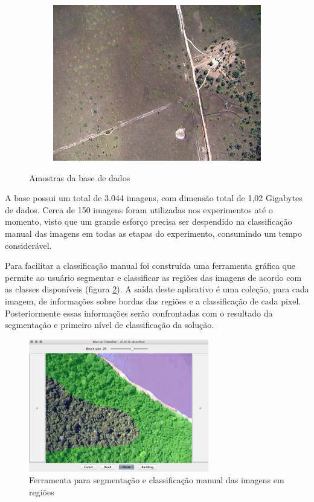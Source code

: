 \begin{figure}[h]
\begin{subfigure}[b]{0.3\textwidth}
    \includegraphics[width=\textwidth]{imgs/amostra3}
  \end{subfigure}%
  \caption{Amostras da base de dados}
  \label{fig:amostra}
\end{figure}

A base possui um total de 3.044 imagens, com dimensão total de 1,02 Gigabytes de dados. Cerca de 150 imagens foram utilizadas nos experimentos até o momento, visto que um grande esforço precisa ser despendido na classificação manual das imagens em todas as etapas do experimento, consumindo um tempo considerável.

Para facilitar a classificação manual foi construída uma ferramenta gráfica que permite ao usuário segmentar e classificar as regiões das imagens de acordo com as classes disponíveis (figura \ref{fig:visualClassifier}). A saída deste aplicativo é uma coleção, para cada imagem, de informações sobre bordas das regiões e a classificação de cada pixel. Posteriormente essas informações serão confrontadas com o resultado da segmentação e primeiro nível de classificação da solução.

\begin{figure}[h]
  \centering
  \includegraphics[width=0.7\textwidth]{imgs/visualClassifier}
  \caption{Ferramenta para segmentação e classificação manual das imagens em regiões}
  \label{fig:visualClassifier}
\end{figure}

